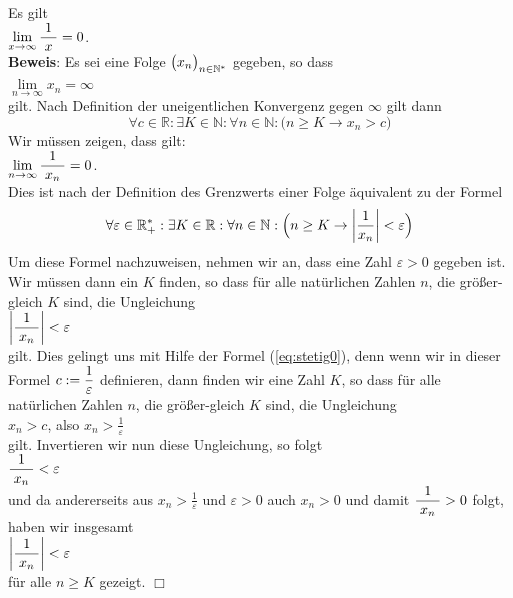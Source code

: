 \example 
Es gilt
\\[0.2cm]
\hspace*{1.3cm}      
$\lim\limits_{x\rightarrow\infty} \displaystyle\frac{\;\displaystyle1\;}{\;\displaystyle x\;} = 0$.
\\[0.2cm]
\textbf{Beweis}:  Es sei eine Folge $\bigl(x_n\bigr)_{n\in\mathbb{N}^*}$ gegeben, so dass 
\\[0.2cm]
\hspace*{1.3cm}      
$\lim\limits_{n\rightarrow\infty} x_n = \infty$
\\[0.2cm]
gilt.   Nach Definition der uneigentlichen Konvergenz gegen $\infty$ gilt dann
\begin{equation}
  \label{eq:stetig0}  
  \forall c \in \mathbb{R}: \exists K \in \mathbb{N}:\forall n \in \mathbb{N}: \bigl(n \geq K \rightarrow x_n > c\bigr)
\end{equation}
Wir m\"ussen zeigen, dass gilt:
\\[0.2cm]
\hspace*{1.3cm}
$\displaystyle \lim\limits_{n\rightarrow\infty} \displaystyle\frac{\;\displaystyle1\;}{\;\displaystyle x_n\;} = 0$.
\\[0.2cm]
Dies ist nach der Definition des Grenzwerts einer Folge \"aquivalent zu der Formel
\begin{equation}
  \label{eq:stetig1}
  \forall \varepsilon \in\mathbb{R}_+^*: \exists K \in \mathbb{R} : \forall n \in \mathbb{N}
  :\Bigl(n \geq K \rightarrow \left|\frac{1}{x_n}\right| < \varepsilon\Bigr)
\end{equation}
Um diese Formel nachzuweisen, nehmen wir an, dass eine Zahl $\varepsilon>0$
gegeben ist.  Wir m\"ussen dann ein $K$ finden, so dass f\"ur alle nat\"urlichen Zahlen $n$, die
gr\"o{\ss}er-gleich $K$ sind, die Ungleichung 
\\[0.2cm]
\hspace*{1.3cm} $\left|\displaystyle\frac{\;\displaystyle1\;}{\;\displaystyle x_n\;}\right| < \varepsilon$
\\[0.2cm]
gilt.  Dies gelingt uns mit Hilfe der Formel (\ref{eq:stetig0}), denn wenn wir in dieser Formel
$\displaystyle c := \frac{1}{\varepsilon}$ definieren, dann finden wir eine Zahl $K$, so dass f\"ur alle
nat\"urlichen Zahlen $n$, die
gr\"o{\ss}er-gleich $K$ sind, die Ungleichung  
\\[0.2cm] \hspace*{1.3cm} $\displaystyle x_n > c$, \quad also $\displaystyle x_n > \frac{1}{\varepsilon}$ \\[0.2cm]
gilt.  Invertieren wir nun diese Ungleichung, so folgt
\\[0.2cm]
\hspace*{1.3cm}
$\displaystyle\frac{\;\displaystyle1\;}{\;\displaystyle x_n\;} < \varepsilon$
\\[0.2cm]
und da andererseits aus $x_n > \frac{1}{\varepsilon}$ und $\varepsilon > 0$ auch $x_n > 0$
und damit $\displaystyle\frac{\;\displaystyle1\;}{\;\displaystyle x_n\;} > 0$ folgt, haben wir insgesamt 
\\[0.2cm]
\hspace*{1.3cm}
$\left|\displaystyle\frac{\;\displaystyle1\;}{\;\displaystyle x_n\;}\right| < \varepsilon$
\\[0.2cm]
f\"ur alle $n \geq K$ gezeigt. \hspace*{\fill} $\Box$
\vspace*{0.3cm}

